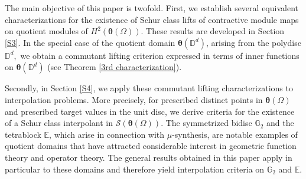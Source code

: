 \documentclass[12pt,reqno]{amsart}
\theoremstyle{remark}
\theoremstyle{definition}
\def \z{\boldsymbol{z}}
\begin{document}
The main objective of this paper is twofold. First, we establish several equivalent characterizations for the existence of Schur class lifts of contractive module maps on quotient modules of $H^2(\boldsymbol \theta(\Omega))$. These results are developed in Section \ref{S3}. In the special case of the quotient domain $\boldsymbol \theta(\mathbb D^d)$, arising from the polydisc $\mathbb D^d,$ we obtain a commutant lifting criterion expressed in terms of inner functions on $\boldsymbol \theta(\mathbb D^d)$ (see Theorem \ref{3rd characterization}). 

Secondly, in Section \ref{S4}, we apply these commutant lifting characterizations to interpolation problems. More precisely, for prescribed distinct points in $\boldsymbol \theta(\Omega)$ and prescribed target values in the unit disc, we derive criteria for the existence of a Schur class interpolant in $\mathcal{S}(\boldsymbol \theta(\Omega)).$ 
The symmetrized bidisc $\mathbb G_2$ and the tetrablock $\mathbb E$, which arise in connection with $\mu$-synthesis, are notable examples of quotient domains that have attracted considerable interest in geometric function theory and operator theory. The general results obtained in this paper apply in particular to these domains and therefore yield interpolation criteria on $\mathbb G_2$ and $\mathbb E.$






\end{document}

